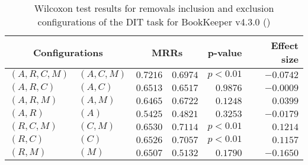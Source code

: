 
\begin{table}
\begin{spacing}{1.2}
\centering
\caption{Wilcoxon test results for removals inclusion and exclusion configurations of the DIT task for BookKeeper v4.3.0 (\ctwo)}
\label{table:versus-wilcox-bookkeeper-dit-removals}
\begin{tabular}{ll|rr|rr}
\toprule
      \multicolumn{2}{c|}{Configurations} &                \multicolumn{2}{c|}{MRRs} &             p-value & Effect size \\
\midrule
 $(A,R,C,M)$ &  $(A,C,M)$ &  $\bm{0.7216}$ &       $0.6974$ & $p<0.01$ &   $-0.0742$ \\
   $(A,R,C)$ &    $(A,C)$ &       $0.6513$ &  $\bm{0.6517}$ & $0.9876$ &   $-0.0009$ \\
   $(A,R,M)$ &    $(A,M)$ &       $0.6465$ &  $\bm{0.6722}$ & $0.1248$ &    $0.0399$ \\
     $(A,R)$ &      $(A)$ &  $\bm{0.5425}$ &       $0.4821$ & $0.3253$ &   $-0.0179$ \\
   $(R,C,M)$ &    $(C,M)$ &       $0.6530$ &  $\bm{0.7114}$ & $p<0.01$ &    $0.1214$ \\
     $(R,C)$ &      $(C)$ &       $0.6526$ &  $\bm{0.7057}$ & $p<0.01$ &    $0.1157$ \\
     $(R,M)$ &      $(M)$ &  $\bm{0.6507}$ &       $0.5132$ & $0.1790$ &   $-0.1650$ \\
\bottomrule
\end{tabular}

\end{spacing}
\end{table}

